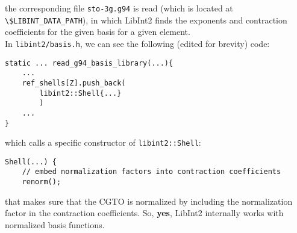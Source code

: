 \documentclass[12pt]{article}
\begin{document}
    the corresponding file \lstinline{sto-3g.g94} is read (which is located at \lstinline{\$LIBINT_DATA_PATH}), in which LibInt2 finds the exponents and contraction coefficients for the given basis for a given element. \\

    In \lstinline{libint2/basis.h}, we can see the following (edited for brevity) code:

\begin{lstlisting}
static ... read_g94_basis_library(...){
    ...
    ref_shells[Z].push_back(
        libint2::Shell{...}
        )
    ...
}
\end{lstlisting}

    which calls a specific constructor of \lstinline{libint2::Shell}:

\begin{lstlisting}
Shell(...) {
    // embed normalization factors into contraction coefficients
    renorm();
\end{lstlisting}

    that makes sure that the CGTO is normalized by including the normalization factor in the contraction coefficients. So, \textbf{yes}, LibInt2 internally works with normalized basis functions.
\end{document}
